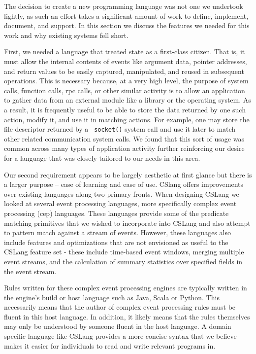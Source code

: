 The decision to create a new programming language was not one we
undertook lightly,
as such an effort takes
a significant amount of work
to define,
implement, document, and support.
In this section we discuss the features we needed for this work
and why existing systems fell short.

First, we needed a language that treated state as a first-class citizen.
That is, it must allow the internal contents of events like argument data,
pointer addresses, and return values to be easily captured, manipulated, and
reused in subsequent operations.
This is necessary because,
at a very high level,
the purpose of system calls,
function calls,
rpc calls,
or other similar activity
is to allow an application
to gather data from an external module like a library or the operating
system.
As a result, it is frequently useful to be able to store the data returned by
one such action, modify it, and use it in matching actions.
For example, one may store the file descriptor returned by a {\tt
socket()} system call and use it later to match other related
communication system calls.
We found that this sort of usage was common across many types of
application activity further reinforcing our desire for a language that was
closely tailored to our needs in this area.




Our second requirement appears to be largely aesthetic at first glance
but there is a
larger purpose -- ease of learning and ease of use.  CSlang offers
improvements over existing languages along two primary fronts.
When designing CSLang we looked at several event processing languages, more
specifically complex event processing (cep) languages.  These languages
provide some of the predicate matching primitives that we wished to
incorporate into CSLang and also attempt to pattern match against a stream
of events. However, these languages also include features and optimizations
that are not envisioned as useful to the CSLang feature set - these include
time-based event windows, merging multiple event streams, and the calculation of
summary statistics over specified fields in the event stream.

Rules written for these complex event processing engines are typically
written in the engine's build or host language such as Java, Scala or
Python. This necessarily means that the author of complex event processing
rules must be fluent in this host language.  In addition, it likely means
that the rules themselves may only be understood by someone fluent in the
host language.  A domain specific language like CSLang provides a more
concise syntax that we believe makes it easier for individuals to read and
write relevant programs in.

